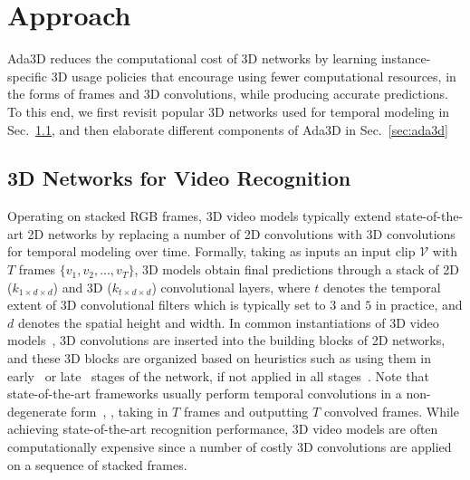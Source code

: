 \documentclass[final]{cvpr}
\newcommand{\system}{{Ada3D}\xspace}
\begin{document}
 
\section{Approach}
\system reduces the computational cost of 3D networks by learning instance-specific 3D usage policies that encourage using fewer computational resources, in the forms of frames and 3D convolutions, while producing accurate predictions. To this end, we first revisit popular 3D networks used for temporal modeling in Sec.~\ref{sec:3d}, and then elaborate different components of \system in Sec.~\ref{sec:ada3d}


\subsection{3D Networks for Video Recognition}
\label{sec:3d}
Operating on stacked RGB frames, 3D video models typically extend state-of-the-art 2D networks by replacing a number of 2D convolutions with 3D convolutions for temporal modeling over time. Formally, taking as inputs an input clip $\mathcal{V}$ with $T$ frames $\{v_1, v_2, ..., v_T\}$, 3D models obtain final predictions through a stack of 2D ($k_{1 \times d\times d}$) and 3D ($k_{t \times d \times d}$) convolutional layers, where $t$ denotes the temporal extent of 3D convolutional filters which is typically set to $3$ and $5$ in practice, and $d$ denotes the spatial height and width. In common instantiations of 3D video models~\cite{c3d,r21d,quovadis,s3d,slowfast,x3d}, 3D convolutions are inserted into the building blocks of 2D networks, and these 3D blocks are organized based on heuristics such as using them in early~\cite{s3d,r21d} or late~\cite{slowfast,s3d,tpn} stages of the network, if not applied in all stages~\cite{quovadis,x3d,r21d,c3d}. 
Note that state-of-the-art frameworks usually perform temporal convolutions in a non-degenerate form~\cite{slowfast,x3d}, \ie, taking in $T$ frames and outputting $T$  convolved frames.
While achieving state-of-the-art recognition performance, 3D video models are often computationally expensive since a number of costly 3D convolutions are applied on a sequence of stacked frames. 
\end{document}
